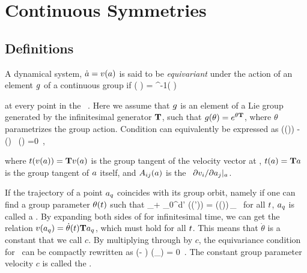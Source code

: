\section{Continuous Symmetries}
\label{s:symm}

\subsection{Definitions}
\label{s:Definitions}

A dynamical system, $\dot{a}=v(a)$ is said to be \emph{equivariant} under the action of
an element $g$ of a continuous group if
\beq
	\vel( \ssp ) =  \LieEl^{-1}\vel( \LieEl \ssp )
	\,

\noindent at every point in the \statesp\ \pS. Here we assume that $g$ is an element of a Lie group generated by the infinitesimal generator $\mathbf{T}$, 
such that $g(\theta) = e^{\theta \mathbf{T}}$, where $\theta$ parametrizes the group action. Condition  can equivalently be expressed as
\beq
  \groupTan(\vel(\ssp))  - \Mvar(\ssp) \, \groupTan(\ssp) =0
  \,,

\noindent where $ t(v(a)) = \mathbf{T} v(a) $ is the group tangent of the velocity vector at \ssp, $ t(a) = \mathbf{T} a $ is the group tangent of $a$ itself, 
and $A_{ij}(a)$ is the \stabmat\ ${\partial v_i}/{\partial a_j} |_{a}$.



\label{s:relatives}

If the trajectory of a point $a_q$ coincides with its group
orbit, namely if one can find a group parameter $\theta (t)$ such that
\beq
  \ssp_\stagn + \int_0^\zeit d\zeit' \vel(\ssp (\zeit')) = \LieEl (\theta (\zeit))\,\ssp_\stagn
  \,
for all $t$, $a_q$ is called a \emph{\reqv}. By expanding both sides of 
for infinitesimal time, we can get the relation
$v(a_q) = \dot{\theta}(t) \mathbf{T} a_q$, which must hold for all $t$. This means that $\dot{\theta}$ is a constant that we call $c$. 
By multiplying through by $c$, the equivariance
condition  for \reqva\ can be compactly rewritten as
\beq
(\velRel \Lg - \Mvar ) \vel (\ssp_\stagn) = 0
\,.
The constant group parameter velocity $c$  is called the \emph{\phaseVel}.

